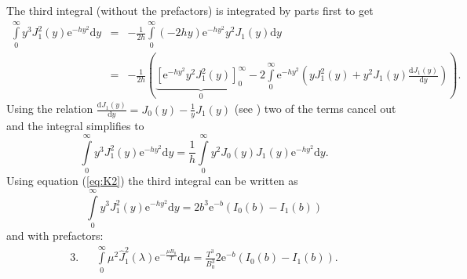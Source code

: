 \documentclass[a4paper,10pt]{article}
\begin{document}
The third integral (without the prefactors) is integrated by parts first to get
\begin{eqnarray*}
	\int \limits_{0}^{\infty} y^3 J_1^2(y) \mathrm{e}^{-h y^2} \mathrm{d} y &=& -\frac{1}{2 h} \int \limits_{0}^{\infty} (-2 h y) \mathrm{e}^{-h y^2} y^2 J_1(y) \mathrm{d} y \\
	&=& -\frac{1}{2h} \left( \underbrace{\left[ \mathrm{e}^{-h y^2} y^2 J_1^2(y) \right]_0^{\infty}}_{0} - 2 \int \limits_0^{\infty}  \mathrm{e}^{-h y^2} \left( y J_1^2(y) + y^2 J_1(y) \frac{\mathrm{d}J_1(y)}{\mathrm{d}y} \right) \right).
\end{eqnarray*}
Using the relation $\frac{\mathrm{d}J_1(y)}{\mathrm{d}y} = J_0(y) - \frac{1}{y} J_1(y)$ (see \cite{a_and_s}) two of the terms cancel out and the integral simplifies to
\begin{equation}
	\int \limits_{0}^{\infty} y^3 J_1^2(y) \mathrm{e}^{-h y^2} \mathrm{d} y = \frac{1}{h} \int \limits_{0}^{\infty} y^2 J_0(y) J_1(y) \mathrm{e}^{-h y^2} \mathrm{d} y. \nonumber
\end{equation}
Using equation (\ref{eq:K2}) the third integral can be written as
\begin{equation}
	\int \limits_{0}^{\infty} y^3 J_1^2(y) \mathrm{e}^{-h y^2} \mathrm{d} y = 2 b^3 \mathrm{e}^{-b} \left( I_0(b) - I_1(b) \right)
\end{equation}
and with prefactors:
\begin{eqnarray}
	3. && \int \limits_{0}^{\infty} \mu^2 \hat{J}_1^2(\lambda) \mathrm{e}^{-\frac{\mu B_0}{T}} \mathrm{d} \mu = \frac{T^3}{B_0^3} 2 \mathrm{e}^{-b} \left( I_0(b) - I_1(b) \right).
	\label{eq:bessel_integral_bpar}
\end{eqnarray}
\end{document}
